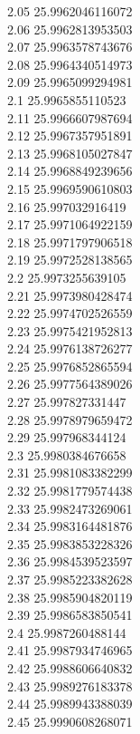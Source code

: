{2.05	25.9962046116072\\
2.06	25.9962813953503\\
2.07	25.9963578743676\\
2.08	25.9964340514973\\
2.09	25.9965099294981\\
2.1	25.9965855110523\\
2.11	25.9966607987694\\
2.12	25.9967357951891\\
2.13	25.9968105027847\\
2.14	25.9968849239656\\
2.15	25.9969590610803\\
2.16	25.997032916419\\
2.17	25.9971064922159\\
2.18	25.9971797906518\\
2.19	25.9972528138565\\
2.2	25.9973255639105\\
2.21	25.9973980428474\\
2.22	25.9974702526559\\
2.23	25.9975421952813\\
2.24	25.9976138726277\\
2.25	25.9976852865594\\
2.26	25.9977564389026\\
2.27	25.997827331447\\
2.28	25.9978979659472\\
2.29	25.997968344124\\
2.3	25.9980384676658\\
2.31	25.9981083382299\\
2.32	25.9981779574438\\
2.33	25.9982473269061\\
2.34	25.9983164481876\\
2.35	25.9983853228326\\
2.36	25.9984539523597\\
2.37	25.9985223382628\\
2.38	25.9985904820119\\
2.39	25.9986583850541\\
2.4	25.9987260488144\\
2.41	25.9987934746965\\
2.42	25.9988606640832\\
2.43	25.9989276183378\\
2.44	25.9989943388039\\
2.45	25.9990608268071\\
}
